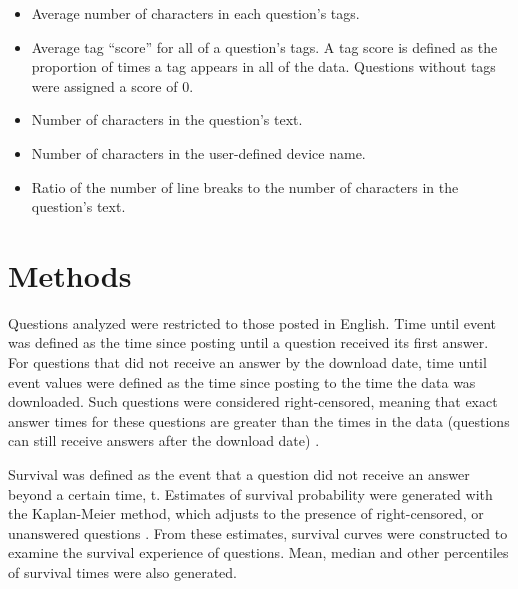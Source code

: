 \documentclass{article}
\begin{document}
\begin{itemize}
  \item Average number of characters in each question's tags. 
  \item Average tag ``score'' for all of a question's tags. A tag score is defined as the proportion of times a tag appears in all of the data. Questions without tags were assigned a score of 0. 
  \item Number of characters in the question's text. 
  \item Number of characters in the user-defined device name. 
  \item Ratio of the number of line breaks to the number of characters in the question's text.
\end{itemize}


\section*{Methods}

Questions analyzed were restricted to those posted in English. Time until event was defined as the time since posting until a question received its first answer. For questions that did not receive an answer by the download date, time until event values were defined as the time since posting to the time the data was downloaded. Such questions were considered right-censored, meaning that exact answer times for these questions are greater than the times in the data (questions can still receive answers after the download date) \cite{Kleinbaum2011}. 

Survival was defined as the event that a question did not receive an answer beyond a certain time, t. Estimates of survival probability were generated with the Kaplan-Meier method, which adjusts to the presence of right-censored, or unanswered questions \cite{Bland1998}. From these estimates, survival curves were constructed to examine the survival experience of questions. Mean, median and other percentiles of survival times were also generated. 
\end{document}
